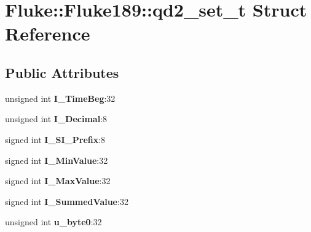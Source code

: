 \hypertarget{structFluke_1_1Fluke189_1_1qd2__set__t}{
\section{Fluke::Fluke189::qd2\_\-set\_\-t Struct Reference}
\label{structFluke_1_1Fluke189_1_1qd2__set__t}
}
\subsection*{Public Attributes}
\begin{DoxyCompactItemize}
\item 
\hypertarget{structFluke_1_1Fluke189_1_1qd2__set__t_ad5d35f66cd39c8e81fa530bd5961cafa}{
unsigned int {\bfseries I\_\-TimeBeg}:32}
\label{structFluke_1_1Fluke189_1_1qd2__set__t_ad5d35f66cd39c8e81fa530bd5961cafa}

\item 
\hypertarget{structFluke_1_1Fluke189_1_1qd2__set__t_a69baa0b996d4ce66d6059e4e1d0b807a}{
unsigned int {\bfseries I\_\-Decimal}:8}
\label{structFluke_1_1Fluke189_1_1qd2__set__t_a69baa0b996d4ce66d6059e4e1d0b807a}

\item 
\hypertarget{structFluke_1_1Fluke189_1_1qd2__set__t_a9bf110d1b46dc0f6757b192be616d0f7}{
signed int {\bfseries I\_\-SI\_\-Prefix}:8}
\label{structFluke_1_1Fluke189_1_1qd2__set__t_a9bf110d1b46dc0f6757b192be616d0f7}

\item 
\hypertarget{structFluke_1_1Fluke189_1_1qd2__set__t_a3f91933041945b6ebacdb3b032a45f1b}{
signed int {\bfseries I\_\-MinValue}:32}
\label{structFluke_1_1Fluke189_1_1qd2__set__t_a3f91933041945b6ebacdb3b032a45f1b}

\item 
\hypertarget{structFluke_1_1Fluke189_1_1qd2__set__t_a097479188bd7baf0f22ba3281b7af1e8}{
signed int {\bfseries I\_\-MaxValue}:32}
\label{structFluke_1_1Fluke189_1_1qd2__set__t_a097479188bd7baf0f22ba3281b7af1e8}

\item 
\hypertarget{structFluke_1_1Fluke189_1_1qd2__set__t_a14d1e9fdfb6947a40276a88ed80373fa}{
signed int {\bfseries I\_\-SummedValue}:32}
\label{structFluke_1_1Fluke189_1_1qd2__set__t_a14d1e9fdfb6947a40276a88ed80373fa}

\item 
\hypertarget{structFluke_1_1Fluke189_1_1qd2__set__t_a99dec780e9f135576159c0bb4edd1493}{
unsigned int {\bfseries u\_\-byte0}:32}
\label{structFluke_1_1Fluke189_1_1qd2__set__t_a99dec780e9f135576159c0bb4edd1493}


\end{DoxyCompactItemize}
